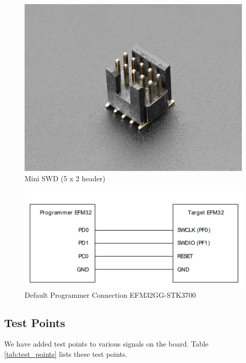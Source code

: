 \documentclass[a4paper,11pt]{article}%
\begin{document}
\begin{figure}[H]
    \centering
    \includegraphics[width=\textwidth]{figures/miniSWD.png}
    \caption{Mini SWD (5 x 2 header)}
\end{figure}

\begin{figure}[H]
    \centering
    \includegraphics[width=\textwidth]{figures/defaultPCefm.png}
    \caption{Default Programmer Connection EFM32GG-STK3700}
\end{figure}

\subsection{Test Points}

We have added test points to various signals on the board. Table \ref{tab:test_points} lists these test points.
\end{document}
